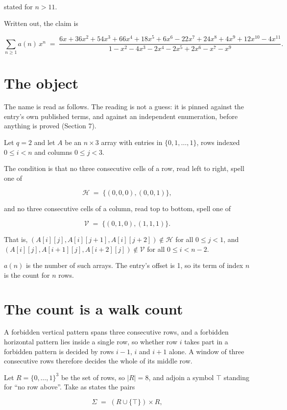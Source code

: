 \documentclass[11pt]{article}
\theoremstyle{definition}
\begin{document}
stated for $n > 11$.

Written out, the claim is

\[\sum_{n \ge 1} a(n)\,x^n \;=\; \frac{6x + 36x^{2} + 54x^{3} + 66x^{4} + 18x^{5} + 6x^{6} - 22x^{7} + 24x^{8} + 4x^{9} + 12x^{10} - 4x^{11}}{1 - x^{2} - 4x^{3} - 2x^{4} - 2x^{5} + 2x^{6} - x^{7} - x^{9}}.\]

\section{The object}

The name is read as follows. The reading is not a guess: it is pinned against the entry's own published terms, and against an independent enumeration, before anything is proved (Section 7).

Let $q = 2$ and let $A$ be an $n \times 3$ array with entries in $\{0,1,\dots,1\}$, rows indexed $0 \le i < n$ and columns $0 \le j < 3$.

The condition is that no three consecutive cells of a row, read left to right, spell one of

\[\mathcal{H} \;=\; \{(0,0,0), (0,0,1)\},\]

and no three consecutive cells of a column, read top to bottom, spell one of

\[\mathcal{V} \;=\; \{(0,1,0), (1,1,1)\}.\]

That is, $(A[i][j],A[i][j{+}1],A[i][j{+}2]) \notin \mathcal{H}$ for all $0 \le j < 1$, and $(A[i][j],A[i{+}1][j],A[i{+}2][j]) \notin \mathcal{V}$ for all $0 \le i < n-2$.

$a(n)$ is the number of such arrays. The entry's offset is 1, so its term of index $n$ is the count for $n$ rows.

\section{The count is a walk count}

A forbidden vertical pattern spans three consecutive rows, and a forbidden horizontal pattern lies inside a single row, so whether row $i$ takes part in a forbidden pattern is decided by rows $i-1$, $i$ and $i+1$ alone. A window of three consecutive rows therefore decides the whole of its middle row.

Let $R = \{0,\dots,1\}^{3}$ be the set of rows, so $|R| = 8$, and adjoin a symbol $\top$ standing for ``no row above''. Take as states the pairs

\[\Sigma \;=\; (R \cup \{\top\}) \times R,\]
\end{document}
